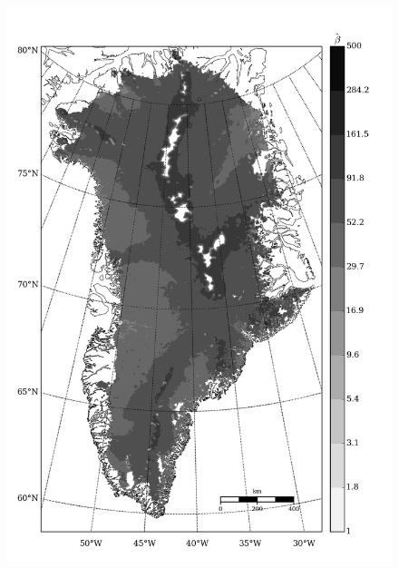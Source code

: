 \begin{figure}
  \centering
  \begin{minipage}[b]{0.47\linewidth}
    \includegraphics[width=1.0\textwidth]{images/greenland/stats/GLM_beta_ind_only.jpg}
  \end{minipage}
  \quad
  \begin{minipage}[b]{0.47\linewidth}

\end{minipage}
\end{figure}
